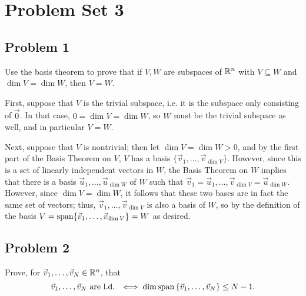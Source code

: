 \documentclass[main.tex]{subfiles}
\begin{document}
\section{Problem Set 3}
\subsection{Problem 1}
\begin{claim}
    Use the basis theorem to prove that if $V, W$ are subspaces of $\mathbb R^n$ with $V \subseteq W$ and $\dim V = \dim W$, then $V = W$. 
\end{claim}

\begin{soln}
    First, suppose that $V$ is the trivial subspace, i.e. it is the subspace only consisting of $\vec{0}$. In that case, $0 = \dim V = \dim W$, so $W$ must be the trivial subspace as well, and in particular $V = W$.

    Next, suppose that $V$ is nontrivial; then let $\dim V = \dim W > 0$, and by the first part of the Basis Theorem on $V$, $V$ has a basis $\{\vec{v}_1, \ldots , \vec{v}_{\dim V}\}$. However, since this is a set of linearly independent vectors in $W$, the Basis Theorem on $W$ implies that there is a basis $\vec{u}_1, \ldots , \vec{u}_{\dim W}$ of $W$ such that $\vec{v}_1 = \vec{u}_1, \ldots , \vec{v}_{\dim V} = \vec{u}_{\dim W}$. However, since $\dim V = \dim W$, it follows that these two bases are in fact the same set of vectors; thus, $\vec{v}_1, \ldots , \vec{v}_{\dim V}$ is also a basis of $W$, so by the definition of the basis $V = \operatorname{span}\{\vec{v}_1, \ldots , \vec{v}_{\dim V}\} = W$ as desired. 
\end{soln}
\eject

\subsection{Problem 2}
\begin{claim}
    Prove, for $\vec{v}_1, \ldots , \vec{v}_N \in \mathbb R^n$, that
    \[\vec{v}_1, \ldots , \vec{v}_N\text{ are l.d. }\iff \dim \operatorname{span}\left\{ \vec{v}_1, \ldots , \vec{v}_N \right\} \le N - 1.\]
\end{claim}
\end{document}
